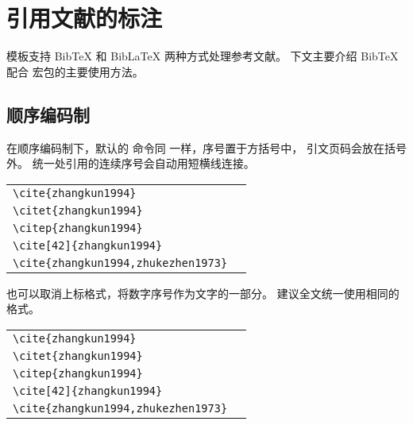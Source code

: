 
\chapter{引用文献的标注}

模板支持 BibTeX 和 BibLaTeX 两种方式处理参考文献。
下文主要介绍 BibTeX 配合  宏包的主要使用方法。


\section{顺序编码制}

在顺序编码制下，默认的  命令同  一样，序号置于方括号中，
引文页码会放在括号外。
统一处引用的连续序号会自动用短横线连接。

\begin{tabular}{l@{\quad$\Rightarrow$\quad}l}
  \verb|\cite{zhangkun1994}|               & \cite{zhangkun1994}               \\
  \verb|\citet{zhangkun1994}|              & \citet{zhangkun1994}              \\
  \verb|\citep{zhangkun1994}|              & \citep{zhangkun1994}              \\
  \verb|\cite[42]{zhangkun1994}|           & \cite[42]{zhangkun1994}           \\
  \verb|\cite{zhangkun1994,zhukezhen1973}| & \cite{zhangkun1994,zhukezhen1973} \\
\end{tabular}


也可以取消上标格式，将数字序号作为文字的一部分。
建议全文统一使用相同的格式。


\begin{tabular}{l@{\quad$\Rightarrow$\quad}l}
  \verb|\cite{zhangkun1994}|               & \cite{zhangkun1994}               \\
  \verb|\citet{zhangkun1994}|              & \citet{zhangkun1994}              \\
  \verb|\citep{zhangkun1994}|              & \citep{zhangkun1994}              \\
  \verb|\cite[42]{zhangkun1994}|           & \cite[42]{zhangkun1994}           \\
  \verb|\cite{zhangkun1994,zhukezhen1973}| & \cite{zhangkun1994,zhukezhen1973} \\
\end{tabular}



